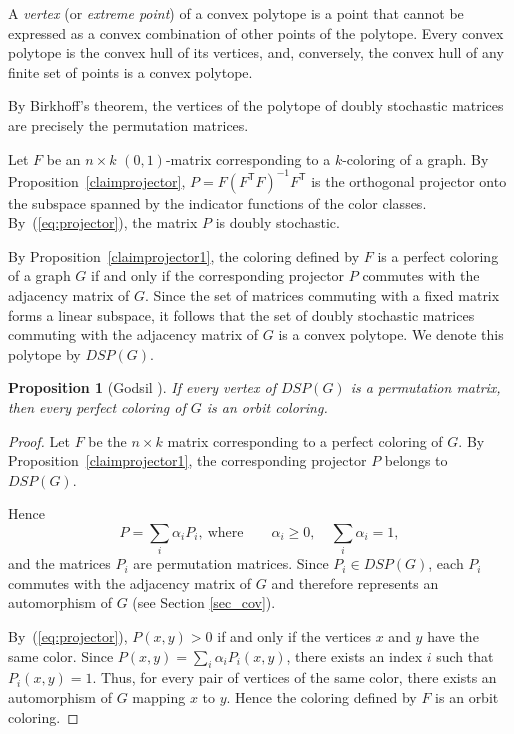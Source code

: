\documentclass[11pt]{article}
\newtheorem{claim}{Proposition}[section]
\theoremstyle{definition}
\begin{document}
{{{A {\sl vertex} (or {\sl extreme point}) of a convex polytope is a point
that cannot be expressed as a convex combination of other points of the
polytope.
Every convex polytope is the convex hull of its vertices, and,
conversely, the convex hull of any finite set of points is a convex
polytope.

By Birkhoff's theorem, the vertices of the polytope of doubly
stochastic matrices are precisely the permutation matrices.

Let $F$ be an $n\times k$ $(0,1)$-matrix corresponding to a
$k$-coloring of a graph.
By Proposition~\ref{claimprojector},
$P=F(F^{\mathsf T}F)^{-1}F^{\mathsf T}$
is the orthogonal projector onto the subspace spanned by the indicator
functions of the color classes.
By~(\ref{eq:projector}), the matrix $P$ is doubly stochastic.

By Proposition~\ref{claimprojector1}, the coloring defined by $F$ is a
perfect coloring of a graph $G$ if and only if the corresponding
projector $P$ commutes with the adjacency matrix of $G$.
Since the set of matrices commuting with a fixed matrix forms a linear
subspace, it follows that the set of doubly stochastic matrices
commuting with the adjacency matrix of $G$ is a convex polytope.
We denote this polytope by $DSP(G)$.

\begin{claim}[Godsil \cite{Godsil97}]
If every vertex of $DSP(G)$ is a permutation matrix, then every perfect
coloring of $G$ is an orbit coloring.
\end{claim}

\begin{proof}
Let $F$ be the $n\times k$ matrix corresponding to a perfect coloring
of $G$.
By Proposition~\ref{claimprojector1}, the corresponding projector
$P$ belongs to $DSP(G)$.

Hence
\[
P=\sum_i\alpha_iP_i,\
\mbox{where}\qquad
\alpha_i\ge0,\quad
\sum_i\alpha_i=1,
\]
and the matrices $P_i$ are permutation matrices.
Since $P_i\in DSP(G)$, each $P_i$ commutes with the adjacency matrix of
$G$ and therefore represents an automorphism of $G$ (see Section \ref{sec_cov}).

By~(\ref{eq:projector}),
$P(x,y)>0$
if and only if the vertices $x$ and $y$ have the same color.
Since
$P(x,y)=\sum_i\alpha_iP_i(x,y)$,
there exists an index $i$ such that
$P_i(x,y)=1$.
Thus, for every pair of vertices of the same color, there exists an
automorphism of $G$ mapping $x$ to $y$.
Hence the coloring defined by $F$ is an orbit coloring.
\end{proof}

}}}
\end{document}
